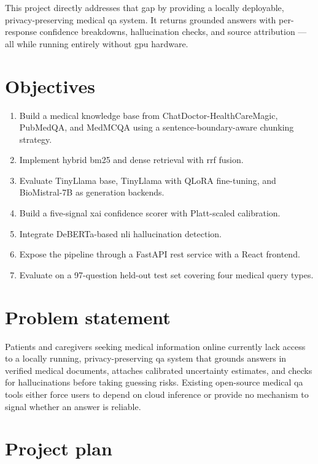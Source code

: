 This project directly addresses that gap by providing a locally deployable, privacy-preserving medical \ac{qa} system. It returns grounded answers with per-response confidence breakdowns, hallucination checks, and source attribution --- all while running entirely without \ac{gpu} hardware.

\section{Objectives}

\begin{enumerate}
    \item Build a medical knowledge base from ChatDoctor-HealthCareMagic, PubMedQA, and \allowbreak{}MedMCQA using a sentence-boundary-aware chunking strategy.
    \item Implement hybrid \ac{bm25} and dense retrieval with \ac{rrf} fusion.
    \item Evaluate TinyLlama base, TinyLlama with QLoRA fine-tuning, and BioMistral-7B as generation backends.
    \item Build a five-signal \ac{xai} confidence scorer with Platt-scaled calibration.
    \item Integrate DeBERTa-based \ac{nli} hallucination detection.
    \item Expose the pipeline through a FastAPI \ac{rest} service with a React frontend.
    \item Evaluate on a 97-question held-out test set covering four medical query types.
\end{enumerate}

\section{Problem statement}

Patients and caregivers seeking medical information online currently lack access to a locally running, privacy-preserving \ac{qa} system that grounds answers in verified medical documents, attaches calibrated uncertainty estimates, and checks for hallucinations before taking guessing risks. Existing open-source medical \ac{qa} tools either force users to depend on cloud inference or provide no mechanism to signal whether an answer is reliable.

\section{Project plan}

